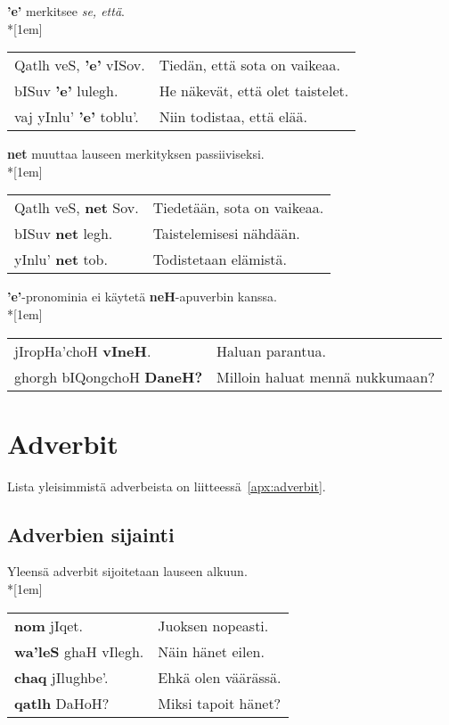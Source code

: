 \documentclass{book}
\begin{document}
\textbf{'e'} merkitsee \textit{se, että}.\\*[1em]
\begin{tabular}{l l}
    Qatlh veS, \textbf{'e'} vISov. & Tiedän, että sota on vaikeaa. \\
    bISuv \textbf{'e'} lulegh. & He näkevät, että olet taistelet. \\
    vaj yInlu' \textbf{'e'} toblu'. & Niin todistaa, että elää. \\
\end{tabular}

\textbf{net} muuttaa lauseen merkityksen passiiviseksi.\\*[1em]
\begin{tabular}{l l}
    Qatlh veS, \textbf{net} Sov. & Tiedetään, sota on vaikeaa. \\
    bISuv \textbf{net} legh. & Taistelemisesi nähdään. \\
    yInlu' \textbf{net} tob. & Todistetaan elämistä. \\
\end{tabular}

\textbf{'e'}-pronominia ei käytetä \textbf{neH}-apuverbin kanssa.
\\*[1em]
\begin{tabular}{l l}
    jIropHa'choH \textbf{vIneH}. & Haluan parantua. \\
    ghorgh bIQongchoH \textbf{DaneH?} & Milloin haluat mennä nukkumaan? \\
\end{tabular}

\chapter{Adverbit}

Lista yleisimmistä adverbeista on liitteessä~\ref{apx:adverbit}.

\section{Adverbien sijainti}

Yleensä adverbit sijoitetaan lauseen alkuun.\\*[1em]
\begin{tabular}{l l}
    \textbf{nom} jIqet. & Juoksen nopeasti. \\
    \textbf{wa'leS} ghaH vIlegh. & Näin hänet eilen. \\
    \textbf{chaq} jIlughbe'. & Ehkä olen väärässä. \\
    \textbf{qatlh} DaHoH? & Miksi tapoit hänet? \\
\end{tabular}
\end{document}
